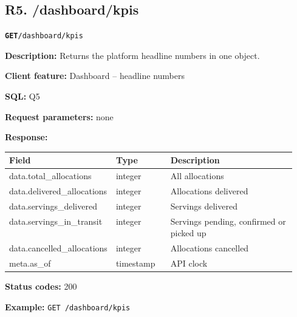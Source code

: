 \documentclass[11pt,letterpaper]{article}
\newcommand{\brk}{\penalty0\relax}
\newcommand{\routebar}[2]{%
  \par\noindent\colorbox{boxGray}{\parbox{\dimexpr\linewidth-2\fboxsep}{%
  \strut\textbf{\texttt{#1}}\quad\texttt{#2}\strut}}\par\smallskip}
\newcommand{\kv}[2]{\textbf{#1:} #2\par}
\begin{document}
\subsection*{R5. /dashboard/kpis}
\routebar{GET}{/dashboard/kpis}
\kv{Description}{Returns the platform headline numbers in one object.}
\kv{Client feature}{Dashboard -- headline numbers}
\kv{SQL}{Q5}
\kv{Request parameters}{none}
\kv{Response}{}
\begin{xltabular}{\linewidth}{>{\ttfamily\raggedright\arraybackslash}p{0.36\linewidth} >{\raggedright\arraybackslash}p{0.19\linewidth} >{\raggedright\arraybackslash}X}
\toprule
\textrm{\textbf{Field}} & \textbf{Type} & \textbf{Description} \\
\midrule
data.\brk{}total\_allocations & integer & All allocations \\
data.\brk{}delivered\_allocations & integer & Allocations delivered \\
data.\brk{}servings\_delivered & integer & Servings delivered \\
data.\brk{}servings\_in\_transit & integer & Servings pending, confirmed or picked up \\
data.\brk{}cancelled\_allocations & integer & Allocations cancelled \\
meta.\brk{}as\_of & timestamp & API clock \\
\bottomrule
\end{xltabular}
\kv{Status codes}{200}
{\raggedright\textbf{Example:} {\small \texttt{GET /\brk{}dashboard/\brk{}kpis}}\par}
\end{document}
